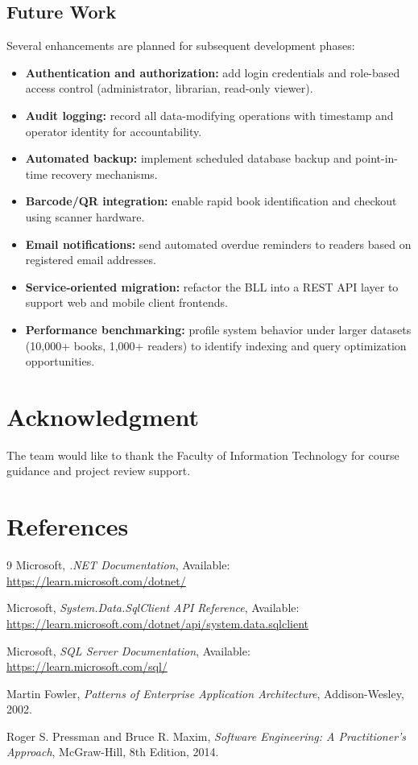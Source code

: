 \documentclass[12pt,a4paper]{article}
\begin{document}
\subsection{Future Work}
Several enhancements are planned for subsequent development phases:
\begin{itemize}[leftmargin=1.5cm]
    \item \textbf{Authentication and authorization:} add login credentials and role-based access control (administrator, librarian, read-only viewer).
    \item \textbf{Audit logging:} record all data-modifying operations with timestamp and operator identity for accountability.
    \item \textbf{Automated backup:} implement scheduled database backup and point-in-time recovery mechanisms.
    \item \textbf{Barcode/QR integration:} enable rapid book identification and checkout using scanner hardware.
    \item \textbf{Email notifications:} send automated overdue reminders to readers based on registered email addresses.
    \item \textbf{Service-oriented migration:} refactor the BLL into a REST API layer to support web and mobile client frontends.
    \item \textbf{Performance benchmarking:} profile system behavior under larger datasets (10,000+ books, 1,000+ readers) to identify indexing and query optimization opportunities.
\end{itemize}

\section*{Acknowledgment}
The team would like to thank the Faculty of Information Technology for course guidance and project review support.

\section*{References}
\begin{thebibliography}{9}
Microsoft,
\textit{.NET Documentation},
Available: \url{https://learn.microsoft.com/dotnet/}

Microsoft,
\textit{System.Data.SqlClient API Reference},
Available: \url{https://learn.microsoft.com/dotnet/api/system.data.sqlclient}

Microsoft,
\textit{SQL Server Documentation},
Available: \url{https://learn.microsoft.com/sql/}

Martin Fowler,
\textit{Patterns of Enterprise Application Architecture},
Addison-Wesley, 2002.

Roger S. Pressman and Bruce R. Maxim,
\textit{Software Engineering: A Practitioner's Approach},
McGraw-Hill, 8th Edition, 2014.
\end{thebibliography}
\end{document}
